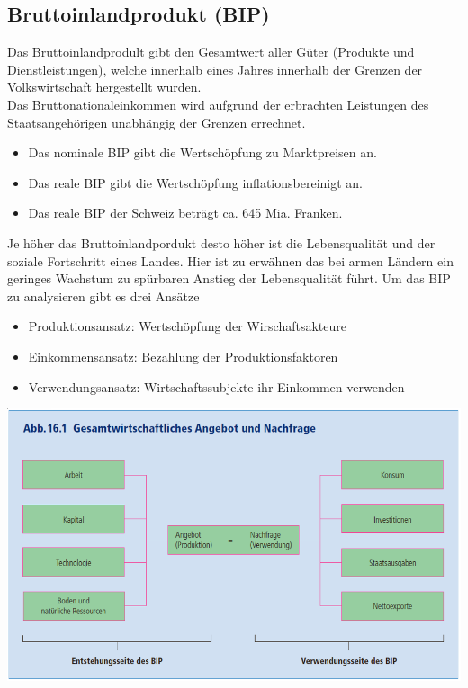 \subsection{Bruttoinlandprodukt (BIP)}
Das Bruttoinlandprodult gibt den Gesamtwert aller Güter (Produkte und Dienstleistungen), welche innerhalb eines Jahres innerhalb der Grenzen der Volkswirtschaft hergestellt wurden.\\
Das Bruttonationaleinkommen wird aufgrund der erbrachten Leistungen des Staatsangehörigen unabhängig der Grenzen errechnet.
\begin{itemize}
	\item Das nominale BIP gibt die Wertschöpfung zu Marktpreisen an.
	\item Das reale BIP gibt die Wertschöpfung inflationsbereinigt an.
	\item Das reale BIP der Schweiz beträgt ca. 645 Mia. Franken.
\end{itemize}
Je höher das Bruttoinlandpordukt desto höher ist die  Lebensqualität und der soziale Fortschritt eines Landes. Hier ist zu erwähnen das bei armen Ländern ein geringes Wachstum zu spürbaren Anstieg der Lebensqualität führt. Um das BIP zu analysieren gibt es drei Ansätze
\begin{itemize}
	\item Produktionsansatz: Wertschöpfung der Wirschaftsakteure
	\item Einkommensansatz: Bezahlung der Produktionsfaktoren
	\item Verwendungsansatz: Wirtschaftssubjekte ihr Einkommen verwenden
\end{itemize}
\includegraphics[width=0.8\linewidth]{images/bip.png}
\clearpage
\pagebreak